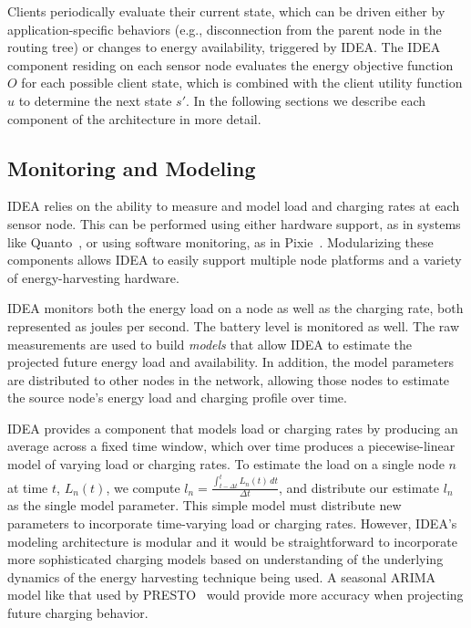 Clients periodically evaluate their current state, which can be driven either
by application-specific behaviors (e.g., disconnection from the parent node
in the routing tree) or changes to energy availability, triggered by IDEA.
The IDEA component residing on each sensor node evaluates the energy
objective function $O$ for each possible client state, which is combined with
the client utility function $u$ to determine the next state $s'$. In the
following sections we describe each component of the architecture in more
detail.

\subsection{Monitoring and Modeling}

IDEA relies on the ability to measure and model load and charging rates at
each sensor node. This can be performed using either hardware support, as in
systems like Quanto~\cite{quanto-osdi08}, or using software monitoring, as in
Pixie~\cite{pixie-sensys08}. Modularizing these components allows IDEA to
easily support multiple node platforms and a variety of energy-harvesting
hardware.

IDEA monitors both the energy load on a node as well as the charging rate,
both represented as joules per second. The battery level is monitored as
well. The raw measurements are used to build \textit{models} that allow IDEA
to estimate the projected future energy load and availability. In addition,
the model parameters are distributed to other nodes in the network, allowing
those nodes to estimate the source node's energy load and charging profile
over time. 

IDEA provides a component that models load or charging rates by producing an
average across a fixed time window, which over time produces a
piecewise-linear model of varying load or charging rates. To estimate the
load on a single node $n$ at time $t$, $L_n(t)$, we compute $l_n =
\frac{\int_{t - \Delta t}^t \!  L_n(t)\, dt}{\Delta t}$, and distribute our
estimate $l_n$ as the single model parameter. This simple model must
distribute new parameters to incorporate time-varying load or charging rates.
However, IDEA's modeling architecture is modular and it would be
straightforward to incorporate more sophisticated charging models based on
understanding of the underlying dynamics of the energy harvesting technique
being used. A seasonal ARIMA model like that used by PRESTO~\cite{presto-TON}
would provide more accuracy when projecting future charging behavior.

